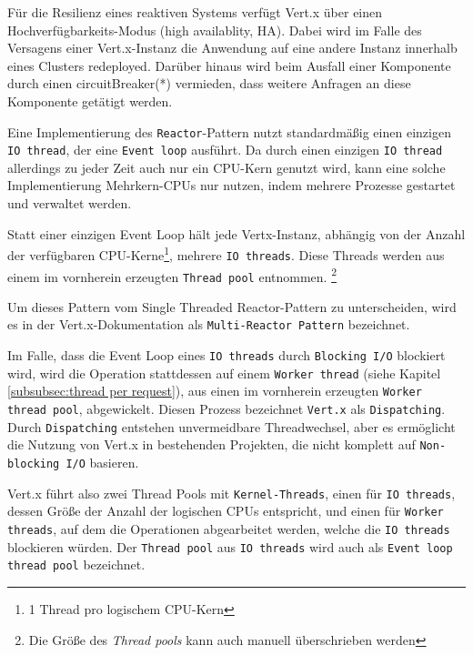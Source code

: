 Für die Resilienz eines reaktiven Systems verfügt Vert.x über einen Hochverfügbarkeits-Modus (high availablity, HA).
Dabei wird im Falle des Versagens einer Vert.x-Instanz die Anwendung auf eine andere Instanz innerhalb eines Clusters redeployed.
Darüber hinaus wird beim Ausfall einer Komponente durch einen \Gls{circuitBreaker}(*) vermieden, dass weitere Anfragen an diese
Komponente getätigt werden.

Eine Implementierung des \verb|Reactor|-Pattern nutzt standardmäßig einen einzigen \linebreak\verb|IO thread|,
der eine \verb|Event loop| ausführt.
Da durch einen einzigen \verb|IO thread| allerdings zu jeder Zeit auch nur ein CPU-Kern genutzt wird, kann
eine solche Implementierung Mehrkern-CPUs nur nutzen, indem mehrere Prozesse gestartet und verwaltet werden.

Statt einer einzigen Event Loop hält jede Vertx-Instanz, abhängig von der Anzahl der verfügbaren CPU-Kerne\footnote{1 Thread pro logischem CPU-Kern},
mehrere \verb|IO threads|. Diese Threads werden aus einem im vornherein erzeugten \verb|Thread pool| entnommen.
\footnote{Die Größe des \textit{Thread pools} kann auch manuell überschrieben werden}

Um dieses Pattern vom Single Threaded Reactor-Pattern zu unterscheiden, wird es in der Vert.x-Dokumentation als \verb|Multi-Reactor Pattern| bezeichnet.
\parencite{Vert.xDocs}

Im Falle, dass die Event Loop eines \verb|IO threads| durch \verb|Blocking I/O| blockiert wird, wird die Operation stattdessen auf einem
\verb|Worker thread| (siehe Kapitel \ref{subsubsec:thread per request}), aus einen im vornherein erzeugten \verb|Worker thread pool|, abgewickelt.
Diesen Prozess bezeichnet \verb|Vert.x| als \verb|Dispatching|.
Durch \verb|Dispatching| entstehen unvermeidbare Threadwechsel, aber es ermöglicht die Nutzung von Vert.x in bestehenden Projekten, die nicht komplett
auf \verb|Non-blocking I/O| basieren.\parencite[Seite 2]{VertxArticle}

Vert.x führt also zwei Thread Pools mit \verb|Kernel-Threads|, einen für \verb|IO threads|, dessen Größe der Anzahl der logischen CPUs entspricht,
und einen für \verb|Worker threads|, auf dem die Operationen abgearbeitet werden, welche die \verb|IO threads| blockieren würden.
Der \verb|Thread pool| aus \verb|IO threads| wird auch als \verb|Event loop thread pool| bezeichnet.
\parencite{Vert.xOptions}

